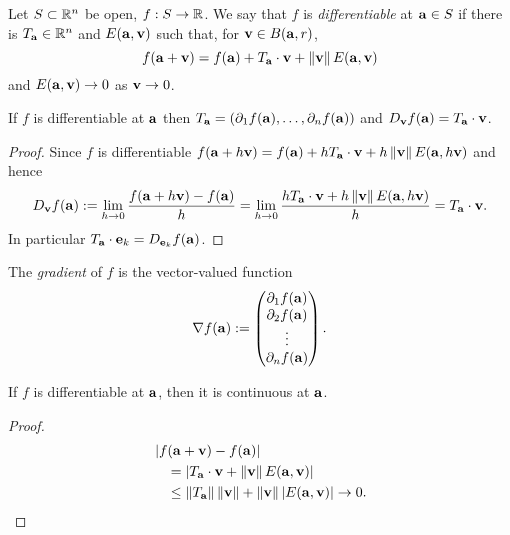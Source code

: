 \begin{definition}[differentiable]
    Let \(S\subset \bR^n\) be open, \(f:S \to \bR\).
    We say that \(f\) is \emph{differentiable} at \(\aa \in S\) if there is \(T_\aa \in \bR^n\) and \(E(\aa,\vv)\) such that, for \(\vv\in B(\aa,r)\),
    \[
        f(\aa+\vv) = f(\aa) + T_\aa \cdot \vv + \norm{\vv}E(\aa,\vv)
    \]
    and \(E(\aa,\vv) \to 0\) as \(\vv \to 0\).
\end{definition}

\begin{theorem}
    If \(f\) is differentiable at \(\aa\)
    then \(T_\aa = \left( \partial_1 f(\aa), \ldots, \partial_nf(\aa) \right)\)
    and \(D_{\vv}f(\aa) = T_{\aa}\cdot \vv\).
\end{theorem}



\begin{proof}
    Since \(f\) is differentiable
    \(  f(\aa+ h \vv) = f(\aa) + h T_\aa \cdot \vv + h\norm{\vv}E(\aa,h\vv)\)
    and hence
    \[
        D_{\vv}f(\aa) :=
        \lim_{h\to 0} \frac{f(\aa+h \vv) - f(\aa)}{h}
        =
        \lim_{h\to 0} \frac{ h T_\aa \cdot \vv + h\norm{\vv}E(\aa,h\vv) }{h}
        = T_\aa \cdot \vv.
    \]
    In particular \(T_\aa\cdot \ee_k = D_{\ee_k}f(\aa)\).
\end{proof}





%
\begin{definition}[gradient]
    The \emph{gradient} of \(f\) is the vector-valued function
    \[
        \nabla f(\aa) :=
        \begin{pmatrix}
            \partial_1 f(\aa) \\
            \partial_2 f(\aa) \\
            \vdots            \\
            \partial_nf(\aa)
        \end{pmatrix}.
    \]
\end{definition}
%




\begin{theorem*}
    If \(f\) is differentiable at \(\aa\), then it is continuous at \(\aa\).
\end{theorem*}
\begin{proof}
    \begin{align*}
         & \abs{f(\aa+\vv)-f(\aa)}                                                            \\
         & \quad = \abs{ T_\aa \cdot \vv + \norm{\vv}E(\aa,\vv)  }                            \\
         & \quad \leq  \norm{T_\aa } \norm{\vv} + \norm{\vv} \abs{E(\aa,\vv)} \to 0. \qedhere
    \end{align*}
\end{proof}








